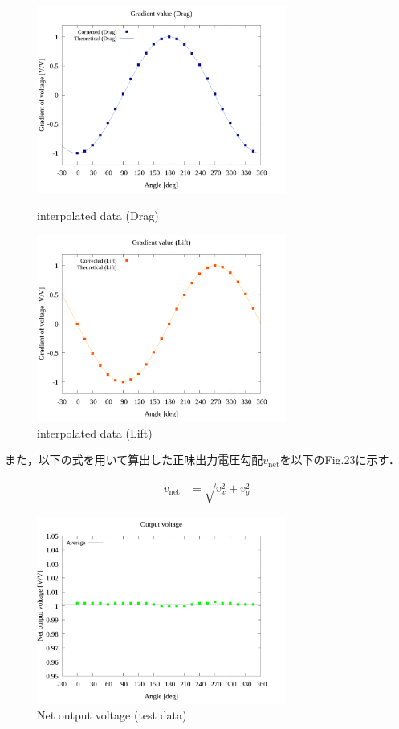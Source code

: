 \documentclass[twocolumn,a4j]{jsarticle}
\begin{document}
\begin{figure}[htbp]
    \footnotesize
    \begin{center}
        \includegraphics[width=82mm]{../../../02_workspace/result/simulation_tx=10.0_ty=-5.0_dx=5.00_dy=-2.50/plot/21/21-4_corrected_angle_drag.png}
        \caption{interpolated data (Drag)}
        \includegraphics[width=82mm]{../../../02_workspace/result/simulation_tx=10.0_ty=-5.0_dx=5.00_dy=-2.50/plot/21/21-4_corrected_angle_lift.png}
        \caption{interpolated data (Lift)}
    \end{center}
\end{figure}

また，以下の式を用いて算出した正味出力電圧勾配$v_{\mathrm{net}}$を以下のFig.23に示す．

\begin{align*}
    v_{\mathrm{net}} & = \sqrt{v_x^2 + v_y^2}
\end{align*}

\begin{figure}[htbp]
    \footnotesize
    \begin{center}
        \includegraphics[width=82mm]{../../../02_workspace/result/simulation_tx=10.0_ty=-5.0_dx=5.00_dy=-2.50/plot/09/09_summary-outputvoltage-net.png}
        \caption{Net output voltage (test data)}
    \end{center}
\end{figure}
\end{document}
